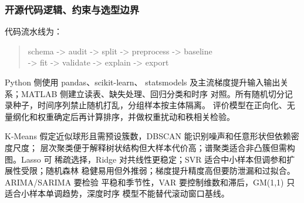 \subsubsection{开源代码逻辑、约束与选型边界}

代码流水线为：
\begin{quote}
\small\ttfamily
schema -> audit -> split -> preprocess -> baseline\\
-> fit -> validate -> explain -> export
\end{quote}
Python 侧使用 pandas、scikit-learn、
statsmodels 及主流梯度提升输入输出关系；MATLAB 侧建立读表、缺失处理、回归分类和时序
对照。所有随机切分记录种子，时间序列禁止随机打乱，分组样本按主体隔离。
评价模型在正向化、无量纲化和权重确定后再计算排序，并做权重扰动和秩相关检验。

K-Means 假定近似球形且需预设簇数，DBSCAN 能识别噪声和任意形状但依赖密度尺度；
层次聚类便于解释树状结构但大样本代价高；谱聚类适合非凸簇但需构图。Lasso 可
稀疏选择，Ridge 对共线性更稳定；SVR 适合中小样本但调参和扩展性受限；随机森林
稳健易用但外推弱；梯度提升精度高但要防泄漏和过拟合。ARIMA/SARIMA 要检验
平稳和季节性，VAR 要控制维数和滞后，GM(1,1) 只适合小样本单调趋势，深度时序
模型不能替代滚动窗口基线。

